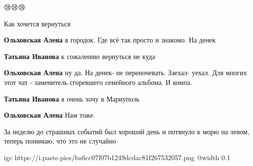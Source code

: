  
 
 
 
 

\qqSecCmt

😢😢😢


Как хочется вернуться

\begin{itemize} %
\textbf{Ольховская Алена} в городок. Где всё так просто и знакомо. На денек

\textbf{Татьяна Иванова} к сожалению вернуться не куда

\textbf{Ольховская Алена} ну да. На денек- не переночевать. Заехал- уехал.
Для многих этот чат - заменитель сгоревшего семейного альбома. И компа.

\textbf{Татьяна Иванова} я очень хочу в Мариуполь

\textbf{Ольховская Алена} Нам тоже.

\end{itemize} %


За неделю до страшных событий был хороший день и потянуло к морю на левом,
теперь понимаю, что это не случайно


\ifcmt
  igc https://i.paste.pics/ba6cc07f07b1249dcdac81f267532057.png
	@width 0.1
\fi
